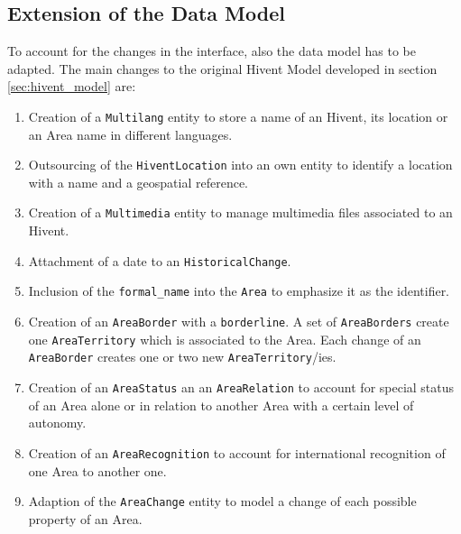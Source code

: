 


\subsection{Extension of the Data Model} %
\label{sub:extension_of_the_data_model}

To account for the changes in the interface, also the data model has to be adapted. The main changes to the original Hivent Model developed in section \ref{sec:hivent_model} are:

\begin{enumerate}
  \item Creation of a \texttt{Multilang} entity to store a name of an Hivent, its location or an Area name in different languages.
  \item Outsourcing of the \texttt{HiventLocation} into an own entity to identify a location with a name and a geospatial reference.
  \item Creation of a \texttt{Multimedia} entity to manage multimedia files associated to an Hivent.
  \item Attachment of a date to an \texttt{HistoricalChange}.
  \item Inclusion of the \texttt{formal\_name} into the \texttt{Area} to emphasize it as the identifier.
  \item Creation of an \texttt{AreaBorder} with a \texttt{borderline}. A set of \texttt{AreaBorders} create one \texttt{AreaTerritory} which is associated to the Area. Each change of an \texttt{AreaBorder} creates one or two new \texttt{AreaTerritory}/ies.
  \item Creation of an \texttt{AreaStatus} an an \texttt{AreaRelation} to account for special status of an Area alone or in relation to another Area with a certain level of autonomy.
  \item Creation of an \texttt{AreaRecognition} to account for international recognition of one Area to another one.
  \item Adaption of the \texttt{AreaChange} entity to model a change of each possible property of an Area.
\end{enumerate}


